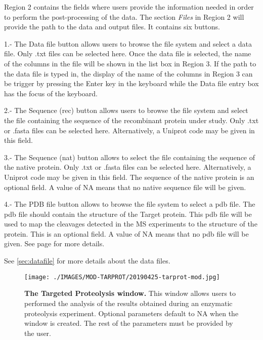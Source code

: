 Region \num{2} contains the fields where users provide the information needed in order to perform the post-processing of the data. The section \textit{Files} in Region \num{2} will provide the path to the data and output files. It contains six buttons. 

\num{1}.- The Data file button allows users to browse the file system and select a data file. Only .txt files can be selected here. Once the data file is selected, the name of the columns in the file will be shown in the list box in Region \num{3}. If the path to the data file is typed in, the display of the name of the columns in Region \num{3} can be trigger by pressing the Enter key in the keyboard while the Data file entry box has the focus of the keyboard.

\num{2}.- The Sequence (rec) button allows users to browse the file system and select the file containing the sequence of the recombinant protein under study. Only .txt or .fasta files can be selected here. Alternatively,  a Uniprot code may be given in this field.

\num{3}.- The Sequence (nat) button allows to select the file containing the sequence of the native protein. Only .txt or .fasta files can be selected here. Alternatively, a Uniprot code may be given in this field. The sequence of the native protein is an optional field. A value of NA means that no native sequence file will be given. 

\num{4}.- The PDB file button allows to browse the file system to select a pdb file. The pdb file should contain the structure of the Target protein. This pdb file will be used to map the cleavages detected in the MS experiments to the structure of the protein. This is an optional field. A value of NA means that no pdb file will be given. See page \pageref{par:pdbID} for more details. 

See \autoref{sec:datafile} for more details about the data files.

\begin{figure}[h]
	\centering
	\texttt{[image: ./IMAGES/MOD-TARPROT/20190425-tarprot-mod.jpg]}
	\caption[The Targeted Proteolysis window]{\textbf{The Targeted Proteolysis window.} This window allows users to performed the analysis of the results obtained during an enzymatic proteolysis experiment. Optional parameters default to NA when the window is created. The rest of the parameters must be provided by the user.} 
	\label{fig:enzdigmw}
	\vspace{-5pt} 	
\end{figure} 

